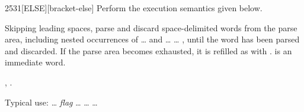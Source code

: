 \pagebreak
\begin{worddef}{2531}{[ELSE]}[bracket-else]
\compile
	Perform the execution semantics given below.

\execute

	Skipping leading spaces, parse and discard space-delimited words
	from the parse area, including nested occurrences of \word{[IF]}
	{\ldots} \word{[THEN]} and \word{[IF]} {\ldots} \word{[ELSE]}
	{\ldots} \linebreak \word{[THEN]}, until the word \word{[THEN]} has been
	parsed and discarded. If the parse area becomes exhausted, it is
	refilled as with . \word{[ELSE]} is an
	immediate word.

\see {},
	.

	\begin{rationale} %
		Typical use:
			{\ldots} \emph{flag}
			\word[tools]{[IF]} {\ldots}
			\word[tools]{[ELSE]} {\ldots}
			\word[tools]{[THEN]} {\ldots}
	\end{rationale}


\end{worddef}
